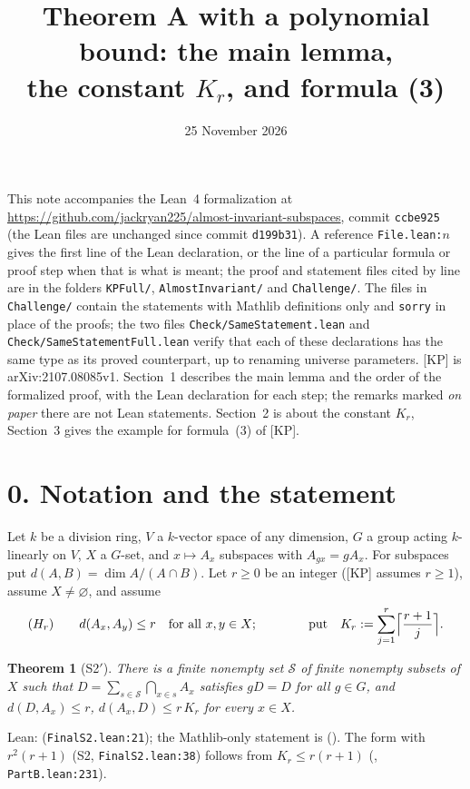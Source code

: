 \documentclass[11pt]{amsart}
\title[Notes on the Lean proof of Theorem A]{Theorem A with a polynomial bound: the main lemma,\\ the constant $K_r$, and formula (3)}
\date{25 November 2026}
\newtheorem*{theorem*}{Theorem}
\begin{document}
\maketitle

\noindent This note accompanies the Lean~4 formalization at
\url{https://github.com/jackryan225/almost-invariant-subspaces}, commit \texttt{ccbe925} (the Lean files are unchanged
since commit \texttt{d199b31}). A reference \texttt{File.lean:$n$} gives the first line of the Lean declaration, or the
line of a particular formula or proof step when that is what is meant; the proof and statement files cited by line are
in the folders \texttt{KPFull/}, \texttt{AlmostInvariant/} and \texttt{Challenge/}. The files in \texttt{Challenge/}
contain the statements with Mathlib definitions only and \texttt{sorry} in place of the proofs; the two files
\texttt{Check/SameStatement.lean} and \texttt{Check/SameStatementFull.lean} verify that each of these declarations has
the same type as its proved counterpart, up to renaming universe parameters. [KP] is
arXiv:2107.08085v1. Section~1 describes the main lemma and the order of the formalized proof, with the Lean declaration
for each step; the remarks marked \emph{on paper} there are not Lean statements. Section~2 is about the constant $K_r$,
Section~3 gives the example for formula~(3) of [KP].

\section*{0. Notation and the statement}

Let $k$ be a division ring, $V$ a $k$-vector space of any dimension, $G$ a group acting $k$-linearly on $V$, $X$ a
$G$-set, and $x\mapsto A_x$ subspaces with $A_{gx}=gA_x$. For subspaces put $d(A,B)=\dim A/(A\cap B)$. Let $r\ge0$ be an
integer ([KP] assumes $r\ge1$), assume $X\neq\varnothing$, and assume
\[ (H_r)\qquad d(A_x,A_y)\le r\quad\text{for all }x,y\in X; \qquad\qquad \text{put}\quad
K_r:=\sum_{j=1}^{r}\Bigl\lceil\frac{r+1}{j}\Bigr\rceil .\]

\begin{theorem*}[S2$'$]
There is a finite nonempty set $\mathcal S$ of finite nonempty subsets of $X$ such that
$D=\sum_{s\in\mathcal S}\bigcap_{x\in s}A_x$ satisfies $gD=D$ for all $g\in G$, and
$d(D,A_x)\le r$, $d(A_x,D)\le r\,K_r$ for every $x\in X$.
\end{theorem*}

\noindent Lean:  (\texttt{FinalS2.lean:21}); the Mathlib-only statement is
 (). The form with $r^2(r+1)$ (S2,
\texttt{FinalS2.lean:38}) follows from $K_r\le r(r+1)$ (, \texttt{PartB.lean:231}).
\end{document}
